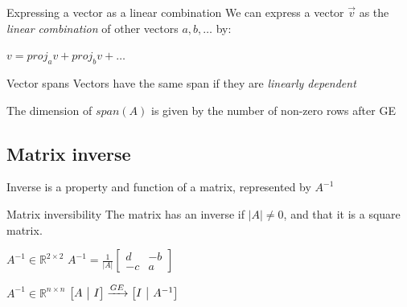 \documentclass{article}
\makeatletter
\newenvironment{amatrix}[1]{%
  \left[\begin{array}{@{}*{#1}{c}|c@{}}
}{%
  \end{array}\right]
}
\makeatother
\begin{document}
\begin{knBox}[]{Expressing a vector as a linear combination}
    We can express a vector $\vec{v}$ as the \emph{linear combination} of other vectors $a, b, \dots$ by:

    $v = proj_av + proj_bv + \dots$
\end{knBox}
\begin{knBox}[]{Vector spans}
    Vectors have the same span if they are \emph{linearly dependent}

    The dimension of $span(A)$ is given by the number of non-zero rows after GE 
\end{knBox}

\subsection{Matrix inverse}
\label{sec:inv}
Inverse is a property and function of a matrix, represented by $A^{-1}$
\begin{propBox}[]{Matrix inversibility}
    The matrix has an inverse if $|A|\ne 0$, and that it is a square matrix.
\end{propBox}
\begin{knBox}[]{$A^{-1} \in \mathds{R}^{2\times 2}$}
    $A^{-1} = \frac{1}{|A|}\begin{bmatrix}
        d &-b\\-c &a
    \end{bmatrix}$
\end{knBox}
\begin{knBox}[]{$A^{-1} \in \mathds{R}^{n\times n}$}
    $\begin{amatrix}{1}
        A&I
    \end{amatrix}\xrightarrow{GE}\begin{amatrix}{1}
        I&A^{-1}
    \end{amatrix}$
\end{knBox}
\end{document}
